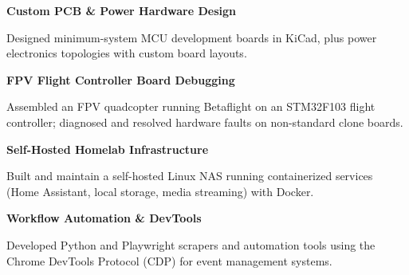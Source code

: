 \documentclass[10pt,a4paper]{article}
\newcommand{\entrytitle}[1]{\textbf{#1}\par}
\begin{document}
\begin{minipage}[t]{0.47\textwidth}
\entrytitle{Custom PCB \& Power Hardware Design}
\small
Designed minimum-system MCU development boards in KiCad, plus power electronics topologies with custom board layouts.
\vspace{0.4em}

\entrytitle{FPV Flight Controller Board Debugging}
\small
Assembled an FPV quadcopter running Betaflight on an STM32F103 flight controller; diagnosed and resolved hardware faults on non-standard clone boards.
\vspace{0.4em}

\entrytitle{Self-Hosted Homelab Infrastructure}
\small
Built and maintain a self-hosted Linux NAS running containerized services (Home Assistant, local storage, media streaming) with Docker.
\vspace{0.4em}

\entrytitle{Workflow Automation \& DevTools}
\small
Developed Python and Playwright scrapers and automation tools using the Chrome DevTools Protocol (CDP) for event management systems.
\vspace{0.4em}

\end{minipage}
\hfill
\end{document}
